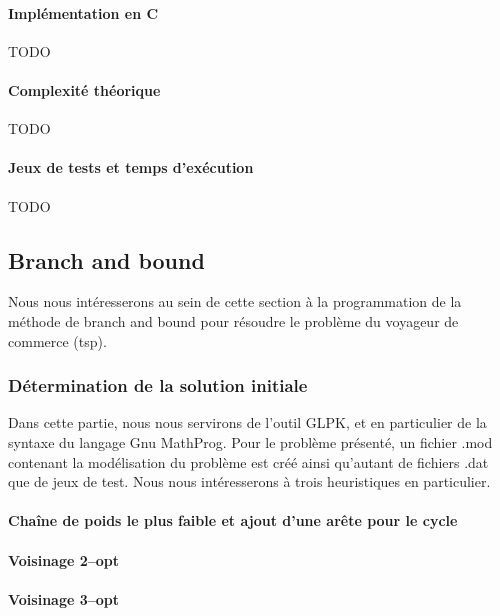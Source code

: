 \documentclass[a4paper, 12pt]{article}
\begin{document}
\paragraph{Implémentation en C}

TODO

\paragraph{Complexité théorique}

TODO

\paragraph{Jeux de tests et temps d'exécution}

TODO


\pagebreak

\subsection{Branch and bound}

Nous nous intéresserons au sein de cette section à la programmation de
la méthode de branch and bound pour résoudre le problème du voyageur
de commerce (tsp).

\subsubsection{Détermination de la solution initiale}

Dans cette partie, nous nous servirons de l'outil GLPK, et en
particulier de la syntaxe du langage Gnu MathProg. Pour le problème
présenté, un fichier .mod contenant la modélisation du problème est
créé ainsi qu'autant de fichiers .dat que de jeux de test. Nous nous
intéresserons à trois heuristiques en particulier.

\paragraph{Chaîne de poids le plus faible et ajout d'une arête pour le
  cycle}


\paragraph{Voisinage 2--opt}

\paragraph{Voisinage 3--opt}
\end{document}
